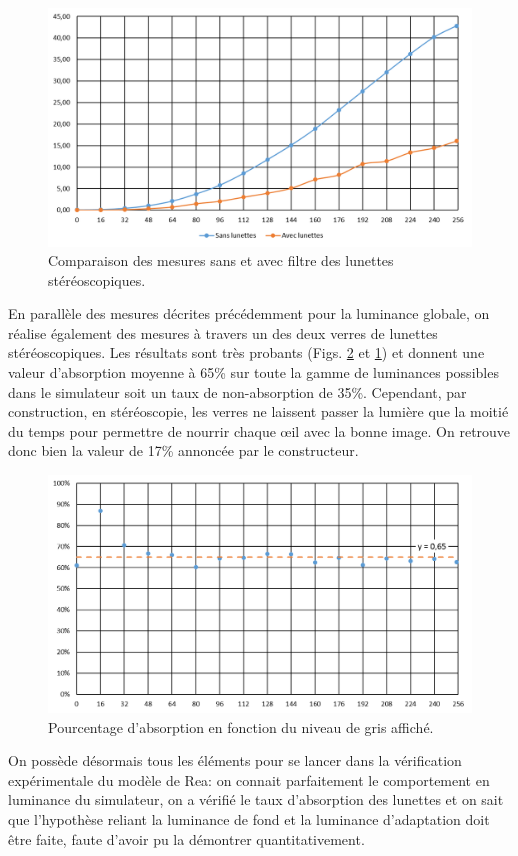 	\begin{figure}[h]
		\centering
		\includegraphics[scale=.75]{Figures/CourbesLuminanceLunettesStereo}
		\caption{Comparaison des mesures sans et avec filtre des lunettes stéréoscopiques.}
		\label{fig:courbes_luminance_avec_sans_filtre}
	\end{figure}
	
	\par En parallèle des mesures décrites précédemment pour la luminance globale, on réalise également des mesures à travers un des deux verres de lunettes stéréoscopiques. Les résultats sont très probants (Figs. \ref{fig:pourcentage_absorption} et \ref{fig:courbes_luminance_avec_sans_filtre}) et donnent une valeur d'absorption moyenne à 65\% sur toute la gamme de luminances possibles dans le simulateur soit un taux de non-absorption de 35\%. Cependant, par construction, en stéréoscopie, les verres ne laissent passer la lumière que la moitié du temps pour permettre de nourrir chaque œil avec la bonne image. On retrouve donc bien la valeur de 17\% annoncée par le constructeur.
	
	\begin{figure}[h]
		\centering
		\includegraphics[scale=.75]{Figures/PourcentageAbsorption}
		\caption{Pourcentage d'absorption en fonction du niveau de gris affiché.}
		\label{fig:pourcentage_absorption}
	\end{figure}
	
	\par On possède désormais tous les éléments pour se lancer dans la vérification expérimentale du modèle de Rea: on connait parfaitement le comportement en luminance du simulateur, on a vérifié le taux d'absorption des lunettes et on sait que l'hypothèse reliant la luminance de fond et la luminance d'adaptation doit être faite, faute d'avoir pu la démontrer quantitativement.
